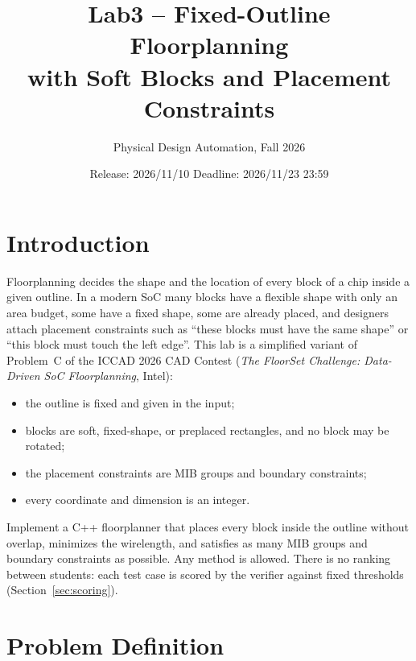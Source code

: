 \documentclass[11pt,a4paper]{article}
\title{\textbf{Lab3 -- Fixed-Outline Floorplanning\\with Soft Blocks and Placement Constraints}}
\author{Physical Design Automation, Fall 2026}
\date{Release: 2026/11/10 \qquad Deadline: 2026/11/23 23:59}
\begin{document}
\maketitle

\section{Introduction}

Floorplanning decides the shape and the location of every block of a chip
inside a given outline. In a modern SoC many blocks have a flexible shape with
only an area budget, some have a fixed shape, some are already placed, and
designers attach placement constraints such as ``these blocks must have the
same shape'' or ``this block must touch the left edge''. This lab is a
simplified variant of Problem~C of the ICCAD 2026 CAD Contest (\emph{The
FloorSet Challenge: Data-Driven SoC Floorplanning}, Intel):
\begin{itemize}
  \item the outline is fixed and given in the input;
  \item blocks are soft, fixed-shape, or preplaced rectangles, and no block
        may be rotated;
  \item the placement constraints are MIB groups and boundary constraints;
  \item every coordinate and dimension is an integer.
\end{itemize}
Implement a C++ floorplanner that places every block inside the outline without
overlap, minimizes the wirelength, and satisfies as many MIB groups and boundary
constraints as possible. Any method is allowed. There is no ranking between
students: each test case is scored by the verifier against fixed thresholds
(Section~\ref{sec:scoring}).

\section{Problem Definition}
\end{document}
